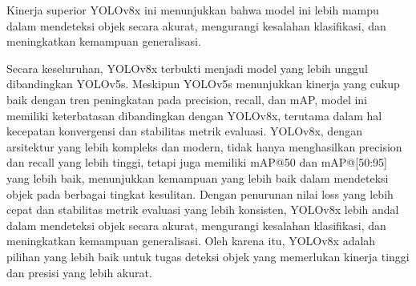 \documentclass[12pt,a4paper]{article}
\begin{document}
\begin{adjustwidth}{3em}{0pt}
\begin{itemize}
Kinerja superior YOLOv8x ini menunjukkan bahwa model ini lebih mampu dalam mendeteksi objek secara akurat, mengurangi kesalahan klasifikasi, dan meningkatkan kemampuan generalisasi.
\end{itemize}
Secara keseluruhan, YOLOv8x terbukti menjadi model yang lebih unggul dibandingkan YOLOv5s. Meskipun YOLOv5s menunjukkan kinerja yang cukup baik dengan tren peningkatan pada precision, recall, dan mAP, model ini memiliki keterbatasan dibandingkan dengan YOLOv8x, terutama dalam hal kecepatan konvergensi dan stabilitas metrik evaluasi. YOLOv8x, dengan arsitektur yang lebih kompleks dan modern, tidak hanya menghasilkan precision dan recall yang lebih tinggi, tetapi juga memiliki mAP@50 dan mAP@[50:95] yang lebih baik, menunjukkan kemampuan yang lebih baik dalam mendeteksi objek pada berbagai tingkat kesulitan. Dengan penurunan nilai loss yang lebih cepat dan stabilitas metrik evaluasi yang lebih konsisten, YOLOv8x lebih andal dalam mendeteksi objek secara akurat, mengurangi kesalahan klasifikasi, dan meningkatkan kemampuan generalisasi. Oleh karena itu, YOLOv8x adalah pilihan yang lebih baik untuk tugas deteksi objek yang memerlukan kinerja tinggi dan presisi yang lebih akurat.
\end{adjustwidth}
\end{document}
